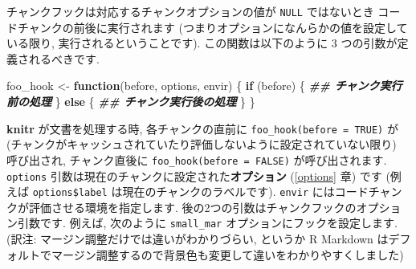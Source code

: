 \documentclass[
  lualatex,ja=standard,jafont=noto-otf]{bxjsreport}
\newenvironment{Shaded}{\begin{snugshade}}{\end{snugshade}}
\newcommand{\AttributeTok}[1]{\textcolor[rgb]{0.77,0.63,0.00}{#1}}
\newcommand{\CommentTok}[1]{\textcolor[rgb]{0.56,0.35,0.01}{\textit{#1}}}
\newcommand{\ControlFlowTok}[1]{\textcolor[rgb]{0.13,0.29,0.53}{\textbf{#1}}}
\newcommand{\DecValTok}[1]{\textcolor[rgb]{0.00,0.00,0.81}{#1}}
\newcommand{\DocumentationTok}[1]{\textcolor[rgb]{0.56,0.35,0.01}{\textbf{\textit{#1}}}}
\newcommand{\FunctionTok}[1]{\textcolor[rgb]{0.00,0.00,0.00}{#1}}
\newcommand{\NormalTok}[1]{#1}
\newcommand{\OtherTok}[1]{\textcolor[rgb]{0.56,0.35,0.01}{#1}}
\newcommand{\SpecialCharTok}[1]{\textcolor[rgb]{0.00,0.00,0.00}{#1}}
\newcommand{\StringTok}[1]{\textcolor[rgb]{0.31,0.60,0.02}{#1}}
\begin{document}
チャンクフックは対応するチャンクオプションの値が \texttt{NULL}
ではないとき コードチャンクの前後に実行されます
(つまりオプションになんらかの値を設定している限り,
実行されるということです). この関数は以下のように 3
つの引数が定義されるべきです.

\begin{Shaded}
\begin{Highlighting}[numbers=left,,]
\NormalTok{foo\_hook }\OtherTok{\textless{}{-}} \ControlFlowTok{function}\NormalTok{(before, options, envir) \{}
  \ControlFlowTok{if}\NormalTok{ (before) \{}
    \DocumentationTok{\#\# チャンク実行前の処理}
\NormalTok{  \} }\ControlFlowTok{else}\NormalTok{ \{}
    \DocumentationTok{\#\# チャンク実行後の処理}
\NormalTok{  \}}
\NormalTok{\}}
\end{Highlighting}
\end{Shaded}

\textbf{knitr} が文書を処理する時, 各チャンクの直前に
\texttt{foo\_hook(before\ =\ TRUE)} が
(チャンクがキャッシュされていたり評価しないように設定されていない限り)
呼び出され, チャンク直後に \texttt{foo\_hook(before\ =\ FALSE)}
が呼び出されます. \texttt{options}
引数は現在のチャンクに設定された\textbf{オプション} (\ref{options} 章)
です (例えば \texttt{options\$label} は現在のチャンクのラベルです).
\texttt{envir} にはコードチャンクが評価させる環境を指定します.
後の2つの引数はチャンクフックのオプション引数です. 例えば, 次のように
\texttt{small\_mar} オプションにフックを設定します. (訳注:
マージン調整だけでは違いがわかりづらい, というか R Markdown
はデフォルトでマージン調整するので背景色も変更して違いをわかりやすくしました)

\begin{Shaded}
\end{Shaded}
\end{document}
